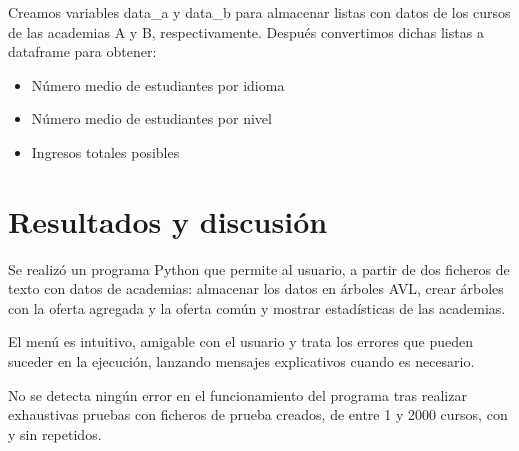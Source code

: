 \documentclass[a4paper]{article}
\begin{document}
Creamos variables data\_a y data\_b para almacenar listas con datos de los cursos de las academias A y B, respectivamente. Después convertimos dichas listas a dataframe para obtener:

\begin{itemize}

\item{Número medio de estudiantes por idioma}

\item{Número medio de estudiantes por nivel}

\item{Ingresos totales posibles}

\end{itemize}


\section{Resultados y discusión}

Se realizó un programa Python que permite al usuario, a partir de dos ficheros de texto con datos de academias: almacenar los datos en árboles AVL, crear árboles con la oferta agregada y la oferta común y mostrar estadísticas de las academias.

El menú es intuitivo, amigable con el usuario y trata los errores que pueden suceder en la ejecución, lanzando mensajes explicativos cuando es necesario.

No se detecta ningún error en el funcionamiento del programa tras realizar exhaustivas pruebas con ficheros de prueba creados, de entre 1 y 2000 cursos, con y sin repetidos.
\end{document}
